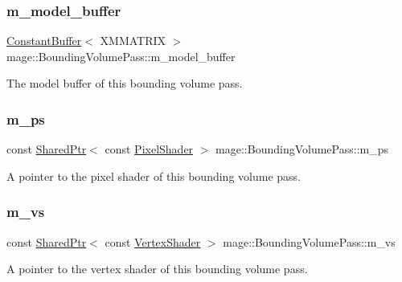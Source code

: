 \subsubsection{\texorpdfstring{m\+\_\+model\+\_\+buffer}{m\_model\_buffer}}
{\footnotesize\ttfamily \hyperlink{classmage_1_1_constant_buffer}{Constant\+Buffer}$<$ X\+M\+M\+A\+T\+R\+IX $>$ mage\+::\+Bounding\+Volume\+Pass\+::m\+\_\+model\+\_\+buffer\hspace{0.3cm}{\ttfamily [private]}}

The model buffer of this bounding volume pass. \hypertarget{classmage_1_1_bounding_volume_pass_a30c85c0e4766e4e330d906af2ecc7463}{}\label{classmage_1_1_bounding_volume_pass_a30c85c0e4766e4e330d906af2ecc7463} 
\subsubsection{\texorpdfstring{m\+\_\+ps}{m\_ps}}
{\footnotesize\ttfamily const \hyperlink{namespacemage_a1e01ae66713838a7a67d30e44c67703e}{Shared\+Ptr}$<$ const \hyperlink{namespacemage_a27ecaf266420ee7a494d64edc0757129}{Pixel\+Shader} $>$ mage\+::\+Bounding\+Volume\+Pass\+::m\+\_\+ps\hspace{0.3cm}{\ttfamily [private]}}

A pointer to the pixel shader of this bounding volume pass. \hypertarget{classmage_1_1_bounding_volume_pass_aa10e1d4cc354b9b0d41789f453ea9cde}{}\label{classmage_1_1_bounding_volume_pass_aa10e1d4cc354b9b0d41789f453ea9cde} 
\subsubsection{\texorpdfstring{m\+\_\+vs}{m\_vs}}
{\footnotesize\ttfamily const \hyperlink{namespacemage_a1e01ae66713838a7a67d30e44c67703e}{Shared\+Ptr}$<$ const \hyperlink{classmage_1_1_vertex_shader}{Vertex\+Shader} $>$ mage\+::\+Bounding\+Volume\+Pass\+::m\+\_\+vs\hspace{0.3cm}{\ttfamily [private]}}

A pointer to the vertex shader of this bounding volume pass. 